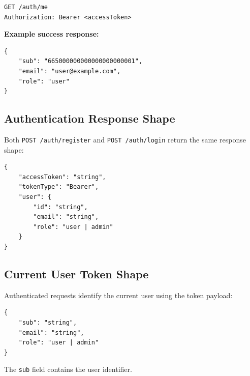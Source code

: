 \begin{verbatim}
GET /auth/me
Authorization: Bearer <accessToken>
\end{verbatim}

\textbf{Example success response:}

\begin{verbatim}
{
	"sub": "665000000000000000000001",
	"email": "user@example.com",
	"role": "user"
}
\end{verbatim}

\subsection{Authentication Response Shape}

Both \texttt{POST /auth/register} and \texttt{POST /auth/login} return the same response shape:

\begin{verbatim}
{
	"accessToken": "string",
	"tokenType": "Bearer",
	"user": {
		"id": "string",
		"email": "string",
		"role": "user | admin"
	}
}
\end{verbatim}

\subsection{Current User Token Shape}

Authenticated requests identify the current user using the token payload:

\begin{verbatim}
{
	"sub": "string",
	"email": "string",
	"role": "user | admin"
}
\end{verbatim}

The \texttt{sub} field contains the user identifier.